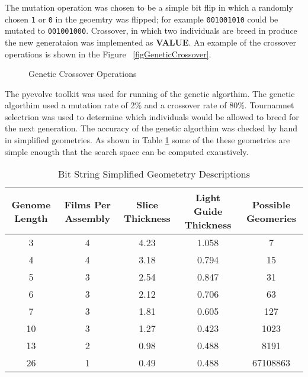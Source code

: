 The mutation operation was chosen to be a simple bit flip in which a randomly chosen \verb+1+ or \verb+0+ in the geoemtry was flipped; for example \verb+001001010+ could be mutated to \verb+001001000+.
Crossover, in which two individuals are breed in produce the new generataion was implemented as \textbf{VALUE}.
An example of the crossover operations is shown in the Figure ~\ref{figGeneticCrossover}.
\begin{figure}
    \caption[Genetic Crossover Operations]{Genetic Crossover Operations}
    \label{fig:GeneticCrossover}
\end{figure}

The pyevolve toolkit was used for running of the genetic algorthim.
The genetic algorthim used a mutation rate of 2\% and a crossover rate of 80\%.
Tournamnet selectrion was used to determine which individuals would be allowed to breed for the next generation.
The accuracy of the genetic algorthim was checked by hand in simplified geometries.
As shown in Table \ref{tab:BitStringGeo} some of the these geometries are simple enougth that the search space can be computed exaustively.
\begin{table}
    \caption[Genome Bit String Geometries]{Bit String Simplified Geometetry Descriptions}
    \label{tab:BitStringGeo}
    \centering
    \begin{tabular}{ c | c c c c}
        Genome Length&Films Per Assembly&Slice Thickness&Light Guide Thickness&Possible Geomeries \\
        \hline
        \hline
        3&4&4.23&1.058&7 \\
        4&4&3.18&0.794&15 \\
        5&3&2.54&0.847&31 \\
        6&3&2.12&0.706&63 \\
        7&3&1.81&0.605&127 \\ 
        \hline
        10&3&1.27&0.423&1023 \\
        \hline
        13&2&0.98&0.488&8191 \\
        26&1&0.49&0.488&67108863 \\
    \end{tabular}
\end{table}



